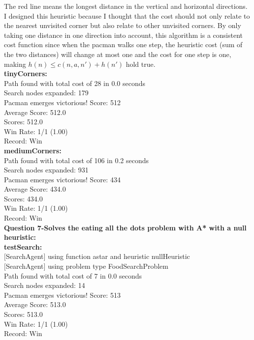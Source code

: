\documentclass[11pt]{article}
\begin{document}
\noindent
The red line means the longest distance in the vertical and horizontal directions. I designed this heuristic because I thought that the cost should not only relate to the nearest unvisited corner but also relate to other unvisited corners. By only taking one distance in one direction into account, this algorithm is a consistent cost function since when the pacman walks one step, the heuristic cost (sum of the two distances) will change at most one and the cost for one step is one, making $h(n) \leq c(n, a, n') + h(n')$ hold true.\\

\noindent
\textbf{tinyCorners:}\\
Path found with total cost of 28 in 0.0 seconds\\
Search nodes expanded: 179\\
Pacman emerges victorious! Score: 512\\
Average Score: 512.0\\
Scores:        512.0\\
Win Rate:      1/1 (1.00)\\
Record:        Win\\

\noindent
\textbf{mediumCorners:}\\
Path found with total cost of 106 in 0.2 seconds\\
Search nodes expanded: 931\\
Pacman emerges victorious! Score: 434\\
Average Score: 434.0\\
Scores:        434.0\\
Win Rate:      1/1 (1.00)\\
Record:        Win\\


\newpage
\noindent
\textbf{Question 7-Solves the eating all the dots problem with A* with a null heuristic:}\\
\textbf{testSearch:}\\
$[$SearchAgent$]$ using function astar and heuristic nullHeuristic\\
$[$SearchAgent$]$ using problem type FoodSearchProblem\\
Path found with total cost of 7 in 0.0 seconds\\
Search nodes expanded: 14\\
Pacman emerges victorious! Score: 513\\
Average Score: 513.0\\
Scores:        513.0\\
Win Rate:      1/1 (1.00)\\
Record:        Win\\
\end{document}
